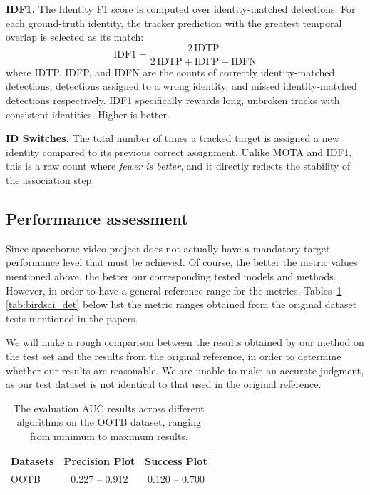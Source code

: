 \documentclass[11pt]{article}
\begin{document}
\textbf{IDF1.} The Identity F1 score is computed over identity-matched detections. For each ground-truth identity, the tracker prediction with the greatest temporal overlap is selected as its match:
\[
  \text{IDF1} = \frac{2\,\text{IDTP}}{2\,\text{IDTP} + \text{IDFP} + \text{IDFN}}
\]
where IDTP, IDFP, and IDFN are the counts of correctly identity-matched detections, detections assigned to a wrong identity, and missed identity-matched detections respectively. IDF1 specifically rewards long, unbroken tracks with consistent identities. Higher is better.

\textbf{ID Switches.} The total number of times a tracked target is assigned a new identity compared to its previous correct assignment. Unlike MOTA and IDF1, this is a raw count where \emph{fewer is better}, and it directly reflects the stability of the association step.


\hypertarget{Performance assessment}{%
\subsection{Performance assessment}\label{Performance assessment}}
Since spaceborne video project does not actually have a mandatory target performance level that must be achieved. 
Of course, the better the metric values mentioned above, the better our corresponding tested models and methods. 
However, in order to have a general reference range for the metrics, Tables~\ref{tab:results}--\ref{tab:birdsai_det} below list the metric ranges obtained from the original dataset tests mentioned in the papers.

We will make a rough comparison between the results obtained by our method on the test set and the results from the original reference, 
in order to determine whether our results are reasonable. We are unable to make an accurate judgment, 
as our test dataset is not identical to that used in the original reference.

\begin{table}[h]
\centering
\begin{tabular}{|l|c|c|}
\hline
\textbf{Datasets} & \textbf{Precision Plot} & \textbf{Success Plot} \\
\hline
OOTB & 0.227 -- 0.912 & 0.120 -- 0.700 \\
\hline
\end{tabular}
\caption{The evaluation AUC results across different algorithms on the OOTB dataset\cite{chen2022single}, ranging from minimum to maximum results.}
\label{tab:results}
\end{table}
\end{document}
